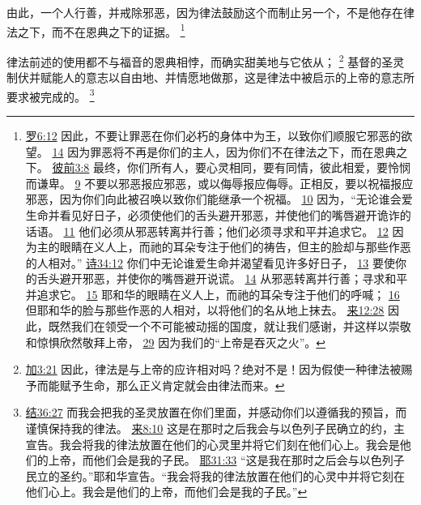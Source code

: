 \documentclass[12pt, a4paper, oneside]{ctexart}
\newcounter{parnum}[section]
\newcommand{\N}{%
   \noindent\refstepcounter{parnum}%
    \makebox[\parindent][l]{\textbf{\arabic{parnum}.}}}
\begin{document}
	由此，一个人行善，并戒除邪恶，因为律法鼓励这个而制止另一个，不是他存在律法之下，而不在恩典之下的证据。
	\footnote {
		\href{https://biblehub.com/romans/6-12.htm}{罗6:12} 因此，不要让罪恶在你们必朽的身体中为王，以致你们顺服它邪恶的欲望。
		\href{https://biblehub.com/romans/6-14.htm}{14} 因为罪恶将不再是你们的主人，因为你们不在律法之下，而在恩典之下。
		\href{https://biblehub.com/1_peter/3-8.htm}{彼前3:8} 最终，你们所有人，要心灵相同，要有同情，彼此相爱，要怜悯而谦卑。
		\href{https://biblehub.com/1_peter/3-9.htm}{9} 不要以邪恶报应邪恶，或以侮辱报应侮辱。正相反，要以祝福报应邪恶，因为你们向此被召唤以致你们能继承一个祝福。
		\href{https://biblehub.com/1_peter/3-10.htm}{10} 因为，“无论谁会爱生命并看见好日子，必须使他们的舌头避开邪恶，并使他们的嘴唇避开诡诈的话语。
		\href{https://biblehub.com/1_peter/3-11.htm}{11} 他们必须从邪恶转离并行善；他们必须寻求和平并追求它。
		\href{https://biblehub.com/1_peter/3-12.htm}{12} 因为主的眼睛在义人上，而祂的耳朵专注于他们的祷告，但主的脸却与那些作恶的人相对。”
		\href{https://biblehub.com/psalms/34-12.htm}{诗34:12} 你们中无论谁爱生命并渴望看见许多好日子，
		\href{https://biblehub.com/psalms/34-13.htm}{13} 要使你的舌头避开邪恶，并使你的嘴唇避开说谎。
		\href{https://biblehub.com/psalms/34-14.htm}{14} 从邪恶转离并行善；寻求和平并追求它。
		\href{https://biblehub.com/psalms/34-15.htm}{15} 耶和华的眼睛在义人上，而祂的耳朵专注于他们的呼喊；
		\href{https://biblehub.com/psalms/34-16.htm}{16} 但耶和华的脸与那些作恶的人相对，以将他们的名从地上抹去。
		\href{https://biblehub.com/hebrews/12-28.htm}{来12:28} 因此，既然我们在领受一个不可能被动摇的国度，就让我们感谢，并这样以崇敬和惊惧欣然敬拜上帝，
		\href{https://biblehub.com/hebrews/12-29.htm}{29} 因为我们的“上帝是吞灭之火”。
	}

\N 律法前述的使用都不与福音的恩典相悖，而确实甜美地与它依从；
	\footnote {
		\href{https://biblehub.com/galatians/3-21.htm}{加3:21} 因此，律法是与上帝的应许相对吗？绝对不是！因为假使一种律法被赐予而能赋予生命，那么正义肯定就会由律法而来。
	}
	基督的圣灵制伏并赋能人的意志以自由地、并情愿地做那，这是律法中被启示的上帝的意志所要求被完成的。
	\footnote {
		\href{https://biblehub.com/ezekiel/36-27.htm}{结36:27} 而我会把我的圣灵放置在你们里面，并感动你们以遵循我的预旨，而谨慎保持我的律法。
		\href{https://biblehub.com/hebrews/8-10.htm}{来8:10} 这是在那时之后我会与以色列子民确立的约，主宣告。我会将我的律法放置在他们的心灵里并将它们刻在他们心上。我会是他们的上帝，而他们会是我的子民。
		\href{https://biblehub.com/jeremiah/31-33.htm}{耶31:33} “这是我在那时之后会与以色列子民立的圣约。”耶和华宣告。“我会将我的律法放置在他们的心灵中并将它刻在他们心上。我会是他们的上帝，而他们会是我的子民。”
	}
\end{document}
